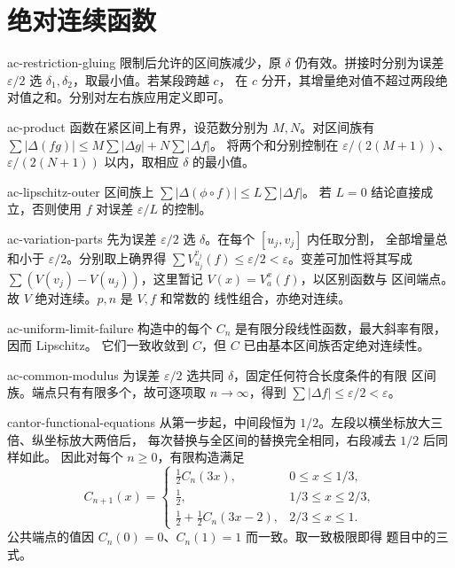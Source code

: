\chapter{绝对连续函数}
\begin{solution}{ac-restriction-gluing}
限制后允许的区间族减少，原 \(\delta\) 仍有效。拼接时分别为误差
\(\varepsilon/2\) 选 \(\delta_1,\delta_2\)，取最小值。若某段跨越 \(c\)，
在 \(c\) 分开，其增量绝对值不超过两段绝对值之和。分别对左右族应用定义即可。
\end{solution}
\begin{solution}{ac-product}
函数在紧区间上有界，设范数分别为 \(M,N\)。对区间族有
\(\sum|\Delta(fg)|\le M\sum|\Delta g|+N\sum|\Delta f|\)。
将两个和分别控制在 \(\varepsilon/(2(M+1))\)、\(\varepsilon/(2(N+1))\)
以内，取相应 \(\delta\) 的最小值。
\end{solution}
\begin{solution}{ac-lipschitz-outer}
区间族上 \(\sum|\Delta(\phi\circ f)|\le L\sum|\Delta f|\)。
若 \(L=0\) 结论直接成立，否则使用 \(f\) 对误差 \(\varepsilon/L\) 的控制。
\end{solution}
\begin{solution}{ac-variation-parts}
先为误差 \(\varepsilon/2\) 选 \(\delta\)。在每个 \([u_j,v_j]\) 内任取分割，
全部增量总和小于 \(\varepsilon/2\)。分别取上确界得
\(\sum V_{u_j}^{v_j}(f)\le\varepsilon/2<\varepsilon\)。变差可加性将其写成
\(\sum(V(v_j)-V(u_j))\)，这里暂记 \(V(x)=V_a^x(f)\)，以区别函数与
区间端点。故 \(V\) 绝对连续。\(p,n\) 是 \(V,f\) 和常数的
线性组合，亦绝对连续。
\end{solution}
\begin{solution}{ac-uniform-limit-failure}
构造中的每个 \(C_n\) 是有限分段线性函数，最大斜率有限，因而 Lipschitz。
它们一致收敛到 \(C\)，但 \(C\) 已由基本区间族否定绝对连续性。
\end{solution}
\begin{solution}{ac-common-modulus}
为误差 \(\varepsilon/2\) 选共同 \(\delta\)，固定任何符合长度条件的有限
区间族。端点只有有限多个，故可逐项取 \(n\to\infty\)，得到
\(\sum|\Delta f|\le\varepsilon/2<\varepsilon\)。
\end{solution}
\begin{solution}{cantor-functional-equations}
从第一步起，中间段恒为 \(1/2\)。左段以横坐标放大三倍、纵坐标放大两倍后，
每次替换与全区间的替换完全相同，右段减去 \(1/2\) 后同样如此。
因此对每个 \(n\ge0\)，有限构造满足
\[
 C_{n+1}(x)=
 \begin{cases}
  \tfrac12 C_n(3x),&0\le x\le1/3,\\
  \tfrac12,&1/3\le x\le2/3,\\
  \tfrac12+\tfrac12 C_n(3x-2),&2/3\le x\le1.
 \end{cases}
\]
公共端点的值因 \(C_n(0)=0\)、\(C_n(1)=1\) 而一致。取一致极限即得
题目中的三式。
\end{solution}
